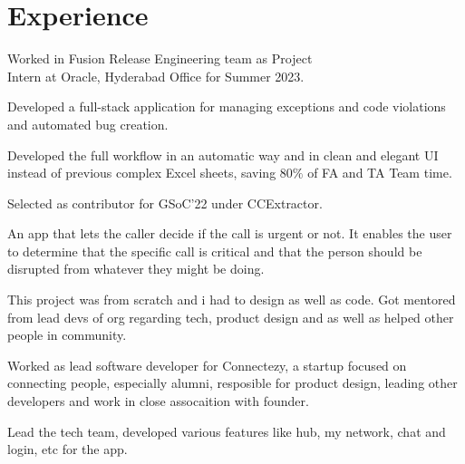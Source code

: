 \documentclass[]{deedy-resume-openfont}
\begin{document}
\hfill
\begin{minipage}[t]{0.69\textwidth} 

\section{Experience}

\hfill {}
\begin{tightemize}
    \item Worked in Fusion Release Engineering team as Project
    \\ Intern at Oracle, Hyderabad Office for Summer 2023.
    \item Developed a full-stack application for managing exceptions and code violations and automated bug creation.
    \item Developed the full workflow in an automatic way and in clean and elegant UI instead of previous complex Excel sheets, saving 80$\%$ of FA and TA Team time.
\end{tightemize}
\sectionsep

\hfill {}
\begin{tightemize}
    \item Selected as contributor for GSoC'22 under CCExtractor.
    \item An app that lets the caller decide if the call is urgent or not. It enables the user to determine that the specific call is critical and that the person should be disrupted from whatever they might be doing.
    \item This project was from scratch and i had to design as well as code. Got mentored from lead devs of org regarding tech, product design and as well as helped other people in community.
\end{tightemize}
\sectionsep

\hfill {}
\begin{tightemize}
    \item Worked as lead software developer for Connectezy, a startup focused on connecting people, especially alumni, resposible for product design, leading other developers and work in close assocaition with founder.
    \item Lead the tech team, developed various features like hub, my network, chat and login, etc for the app. 
\end{tightemize}
\sectionsep


\end{minipage}
\end{document}
